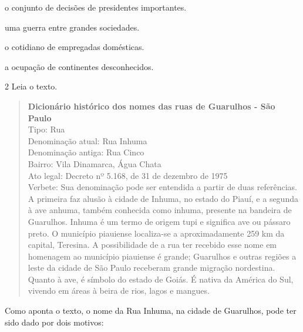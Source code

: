 \begin{escolha}
\item o conjunto de decisões de presidentes importantes.

\item uma guerra entre grandes sociedades.

\item o cotidiano de empregadas domésticas.

\item a ocupação de continentes desconhecidos.
\end{escolha}


\num{2} Leia o texto.

\begin{quote}
\textbf{Dicionário histórico dos nomes das ruas de Guarulhos - São Paulo}\\
Tipo: Rua\\
Denominação atual: Rua Inhuma\\
Denominação antiga: Rua Cinco\\
Bairro: Vila Dinamarca, Água Chata\\
Ato legal: Decreto nº 5.168, de 31 de dezembro de 1975\\
Verbete: Sua denominação pode ser entendida a partir de duas
referências. A primeira faz alusão à cidade de Inhuma, no estado do
Piauí, e a segunda à ave anhuma, também conhecida como inhuma, presente
na bandeira de Guarulhos. Inhuma é um termo de origem tupi e significa
ave ou pássaro preto. O município piauiense localiza-se a
aproximadamente 259 km da capital, Teresina. A possibilidade de a rua
ter recebido esse nome em homenagem ao município piauiense é grande;
Guarulhos e outras regiões a leste da cidade de São Paulo receberam
grande migração nordestina. Quanto à ave, é símbolo do estado de Goiás.
É nativa da América do Sul, vivendo em áreas à beira de rios, lagos e
mangues.
\end{quote}


\noindent{}Como aponta o texto, o nome da Rua Inhuma, na cidade de Guarulhos, pode
ter sido dado por dois motivos:

